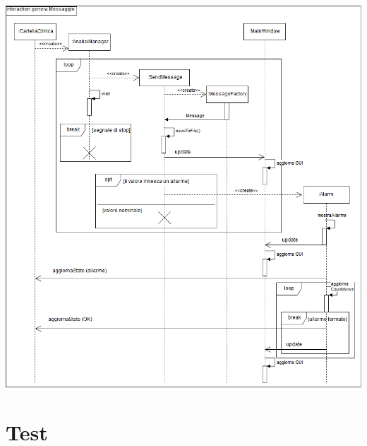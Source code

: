 \documentclass[a4paper]{report}
\begin{document}
\begin{itemize}
\begin{center}
                    \includegraphics[scale=0.5]{sequence/MessageSequence.png}
                \end{center}
                
            \end{itemize}
\chapter{Test}
\end{document}
